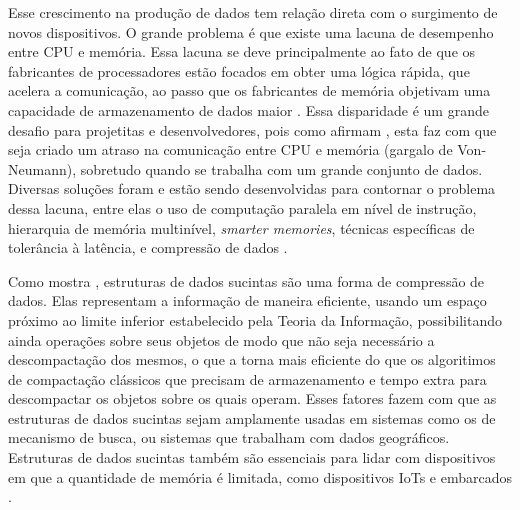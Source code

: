 Esse crescimento na produção de dados tem relação direta com o surgimento de novos dispositivos. O grande problema é que existe uma lacuna de
desempenho entre CPU e memória. Essa lacuna se deve principalmente ao fato de que os fabricantes de processadores estão focados em obter uma lógica rápida,  que acelera a comunicação, ao passo que os fabricantes de memória objetivam uma capacidade de armazenamento de dados maior \citep{paper-processor-memory-bottleneck}. Essa disparidade é um grande desafio para projetitas e desenvolvedores, pois como afirmam \citet{paper-processor-memory-bottleneck},  esta faz com que seja criado um atraso na comunicação entre CPU e memória (gargalo de Von-Neumann), sobretudo quando se trabalha com um grande conjunto de dados. Diversas soluções foram e estão sendo desenvolvidas para contornar o problema dessa lacuna, entre elas o uso de computação paralela em nível de instrução, hierarquia de memória multinível, \textit{smarter memories}, técnicas específicas de tolerância à latência, e compressão de dados \citep{paper-Processor-Memory-bottleneck-Problems-Solutions, paper-processor-memory-bottleneck}.

Como mostra \cite{book-compact-data-structures}, estruturas de dados sucintas são uma forma de compressão de dados. Elas representam a informação de maneira eficiente, usando um espaço próximo ao limite inferior estabelecido pela Teoria da Informação, possibilitando ainda operações sobre seus objetos de modo que não seja necessário a descompactação dos mesmos, o que a torna mais eficiente do que os algoritimos de compactação  clássicos que precisam de armazenamento e tempo extra para descompactar os objetos sobre os quais operam.  Esses fatores fazem com que as estruturas de dados sucintas sejam amplamente usadas em sistemas como os de mecanismo de busca,  ou sistemas que trabalham com dados geográficos. Estruturas de dados sucintas também são essenciais para lidar  com dispositivos em que a quantidade de memória é limitada, como  dispositivos IoTs e embarcados \citep{book-compact-data-structures}. %

